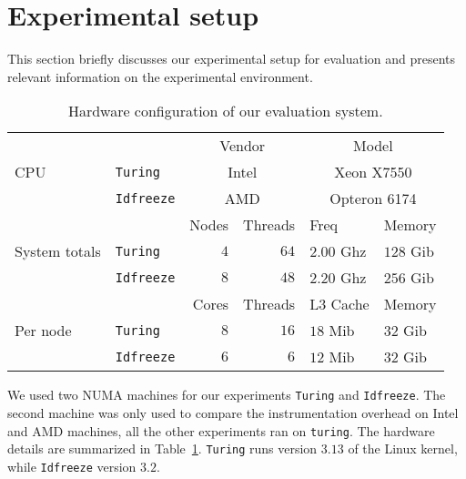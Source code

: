 
\section{Experimental setup}
\label{sec:metho}

This section briefly discusses our experimental setup for \TABARNAC evaluation
and presents relevant information on the experimental environment.

\begin{table}[htb]
    \centering
    \begin{tabular}{lp{1.1cm}rrp{1.35cm}p{1.1cm}}
        \toprule
        \multirow{3}{.8cm}{CPU}
        &  & \multicolumn{2}{c}{Vendor} & \multicolumn{2}{c}{Model} \\
        \cmidrule(lr){3-6}
        & \texttt{Turing}  & \multicolumn{2}{c}{Intel} & \multicolumn{2}{c}{Xeon X7550} \\
        & \texttt{Idfreeze} & \multicolumn{2}{c}{AMD} & \multicolumn{2}{c}{Opteron 6174} \\
        \midrule
        \midrule
        \multirow{3}{.8cm}{System totals}
        & & Nodes & Threads & Freq & Memory \\
        \cmidrule(lr){3-6}
        & \texttt{Turing}   & $4$ & $64$ & $2.00$ Ghz & $128$ Gib \\
        & \texttt{Idfreeze} & $8$ & $48$ & $2.20$ Ghz & $256$ Gib\\
        \midrule
        \midrule
        \multirow{3}{.8cm}{Per node}
        & & Cores & Threads & L3 Cache & Memory \\
        \cmidrule(lr){3-6}
        & \texttt{Turing}   & $8$ & $16$ & $18$ Mib & $32$ Gib \\
        & \texttt{Idfreeze} & $6$ & $6$  & $12$ Mib & $32$ Gib \\
        \bottomrule
    \end{tabular}
    \caption{Hardware configuration of our evaluation system.}
    \label{tab:hw}
\end{table}

We used two NUMA machines for our experiments \texttt{Turing} and
\texttt{Idfreeze}. The second machine was only used to compare the
instrumentation overhead on Intel and AMD machines, all the other experiments
ran on \texttt{turing}. The hardware details are
summarized in Table~\ref{tab:hw}. \texttt{Turing} runs version $3.13$ of the
Linux kernel, while \texttt{Idfreeze} version $3.2$.

